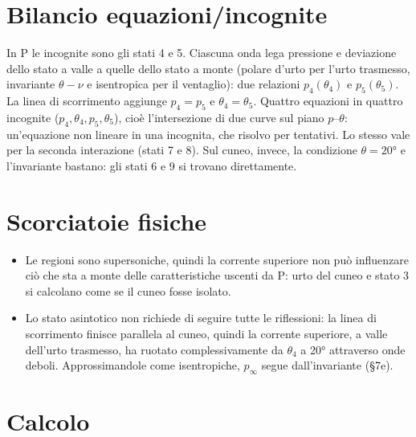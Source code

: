 \documentclass[11pt,a4paper]{article}
\begin{document}
\section{Bilancio equazioni/incognite}
In P le incognite sono gli stati 4 e 5. Ciascuna onda lega pressione e deviazione dello stato a valle a quelle dello
stato a monte (polare d'urto per l'urto trasmesso, invariante $\theta-\nu$ e isentropica per il ventaglio): due
relazioni $p_4(\theta_4)$ e $p_5(\theta_5)$. La linea di scorrimento aggiunge $p_4=p_5$ e $\theta_4=\theta_5$. Quattro
equazioni in quattro incognite ($p_4,\theta_4,p_5,\theta_5$), cioè l'intersezione di due curve sul piano
$p$--$\theta$: un'equazione non lineare in una incognita, che risolvo per tentativi. Lo stesso vale per la seconda
interazione (stati 7 e 8). Sul cuneo, invece, la condizione $\theta=\ang{20}$ e l'invariante bastano: gli stati 6 e 9
si trovano direttamente.

\section{Scorciatoie fisiche}
\begin{itemize}
\item Le regioni sono supersoniche, quindi la corrente superiore non può influenzare ciò che sta a monte delle
  caratteristiche uscenti da P: urto del cuneo e stato 3 si calcolano come se il cuneo fosse isolato.
\item Lo stato asintotico non richiede di seguire tutte le riflessioni: la linea di scorrimento finisce parallela
  al cuneo, quindi la corrente superiore, a valle dell'urto trasmesso, ha ruotato complessivamente da $\theta_4$ a
  \ang{20} attraverso onde deboli. Approssimandole come isentropiche, $p_\infty$ segue dall'invariante (§7e).
\end{itemize}

\section{Calcolo}
\end{document}
